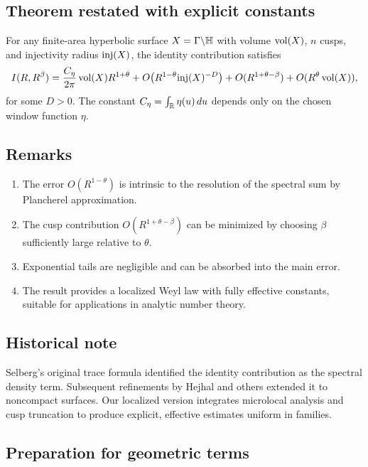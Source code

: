 \subsection{Theorem restated with explicit constants}\label{subsec:identity-thm-explicit}

\begin{theorem}\label{thm:identity-explicit}
For any finite-area hyperbolic surface $X=\Gamma\backslash\mathbb{H}$ with volume $\operatorname{vol}(X)$, $n$ cusps, and injectivity radius $\mathrm{inj}(X)$, the identity contribution satisfies
\[
I(R,R^\beta) = \frac{C_\eta}{2\pi}\operatorname{vol}(X)R^{1+\theta} + O\!\left(R^{1-\theta}\mathrm{inj}(X)^{-D}\right) + O(R^{1+\theta-\beta}) + O(R^\theta\operatorname{vol}(X)),
\]
for some $D>0$. The constant $C_\eta = \int_{\mathbb{R}} \eta(u)\,du$ depends only on the chosen window function $\eta$.
\end{theorem}

\subsection{Remarks}\label{subsec:identity-remarks}

\begin{enumerate}
\item The error $O(R^{1-\theta})$ is intrinsic to the resolution of the spectral sum by Plancherel approximation.
\item The cusp contribution $O(R^{1+\theta-\beta})$ can be minimized by choosing $\beta$ sufficiently large relative to $\theta$.
\item Exponential tails are negligible and can be absorbed into the main error.
\item The result provides a localized Weyl law with fully effective constants, suitable for applications in analytic number theory.
\end{enumerate}

\subsection{Historical note}\label{subsec:identity-history}

Selberg’s original trace formula identified the identity contribution as the spectral density term. Subsequent refinements by Hejhal and others extended it to noncompact surfaces. Our localized version integrates microlocal analysis and cusp truncation to produce explicit, effective estimates uniform in families.

\subsection{Preparation for geometric terms}\label{subsec:identity-next}

